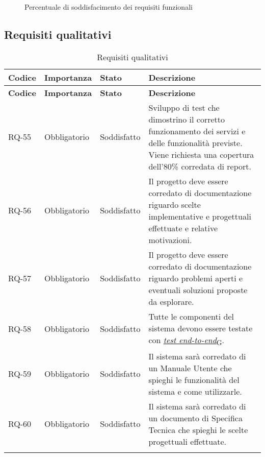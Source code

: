 \begin{figure}[!h]
	\centering
	\caption{Percentuale di soddisfacimento dei requisiti funzionali}
\end{figure}


\newpage 
\subsection{Requisiti qualitativi}
\begin{longtable}{|>{\centering\arraybackslash}m{}|>{\centering\arraybackslash}m{}|>{\centering\arraybackslash}m{}|>{\centering\arraybackslash}m{}|}
	\hline
	\textbf{Codice} & \textbf{Importanza} & \textbf{Stato}& \textbf{Descrizione}\\\hline
	\endfirsthead
	\hline
	\textbf{Codice} & \textbf{Importanza} & \textbf{Stato}& \textbf{Descrizione}\\\hline
	\endhead
	\hline
	RQ-55           & Obbligatorio        & Soddisfatto & Sviluppo di test che dimostrino il corretto funzionamento dei servizi e delle funzionalità previste. Viene richiesta una copertura dell'80\% corredata di report.
	\\\hline
	RQ-56           & Obbligatorio        & Soddisfatto & Il progetto deve essere corredato di documentazione riguardo scelte implementative e progettuali effettuate e relative motivazioni.
	\\\hline
	RQ-57           & Obbligatorio        & Soddisfatto & Il progetto deve essere corredato di documentazione riguardo problemi aperti e eventuali soluzioni proposte da esplorare.
	\\\hline
	RQ-58           & Obbligatorio        & Soddisfatto & Tutte le componenti del sistema devono essere testate con \href{https://7last.github.io/docs/pb/documentazione-interna/glossario\#test-end-to-end}{\textit{test end-to-end}\textsubscript{G}}.
	\\\hline
	RQ-59           & Obbligatorio        & Soddisfatto & Il sistema sarà corredato di un Manuale Utente che spieghi le funzionalità del sistema e come utilizzarle.
	\\\hline
	RQ-60           & Obbligatorio        & Soddisfatto & Il sistema sarà corredato di un documento di Specifica Tecnica che spieghi le scelte progettuali effettuate.
	\\\hline
	\caption{Requisiti qualitativi}
\end{longtable}

